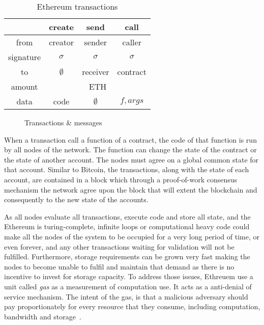 \begin{table}[!ht]
  \centering
  \caption{Ethereum transactions}
  \begin{tabular}{|c|c|c|c|}
  \hline
   & create & send & call \\ \hline
   from & creator & sender & caller \\ \hline
   signature & $\sigma$ & $\sigma$ & $\sigma$ \\ \hline
   to & $\emptyset$ & receiver & contract \\ \hline
   amount & \multicolumn{3}{c|}{ETH} \\ \hline
   data & code & $\emptyset$ & $f, args$ \\ \hline
  \end{tabular}
  \label{fig:eth_transactions}
\end{table}

\begin{figure}[!ht]
  \centering
  \caption{Transactions \& messages}
  \label{fig:eth_transaction}
\end{figure}

When a transaction call a function of a contract, the code of that function is run by all nodes of the network. The function can change the state of the contract or the state of another account. The nodes must agree on a global common state for that account. Similar to Bitcoin, the transactions, along with the state of each account, are contained in a block which through a proof-of-work consensus mechanism the network agree upon the block that will extent the blockchain and consequently to the new state of the accounts.

As all nodes evaluate all transactions, execute code and store all state, and the Ethereum is turing-complete, infinite loops or computational heavy code could make all the nodes of the system to be occupied for a very long period of time, or even forever, and any other transactions waiting for validation will not be fulfilled. Furthermore, storage requirements can be grown very fast making the nodes to become unable to fulfil and maintain that demand as there is no incentive to invest for storage capacity. To address those issues, Ethreuem use a unit called \textit{gas} as a measurement of computation use. It acts as a anti-denial of service mechanism. The intent of the gas, is that a malicious adversary should pay proportionately for every resource that they consume, including computation, bandwidth and storage~\cite{ethereum_whitepaper}.

